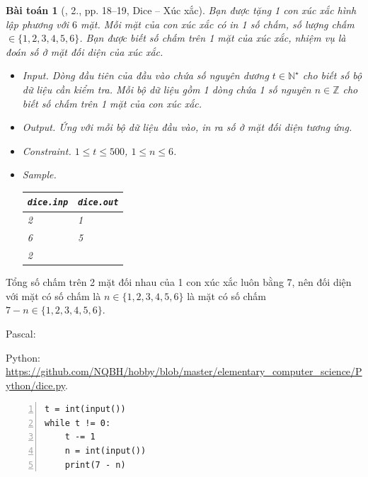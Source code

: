 \documentclass{article}
\newtheorem{baitoan}{Bài toán}
\begin{document}
\begin{baitoan}[\cite{Duc_200_BT_Python}, 2., pp. 18--19, Dice -- Xúc xắc]
	Bạn được tặng 1 con xúc xắc hình lập phương với $6$ mặt. Mỗi mặt của con xúc xắc có in 1 số chấm, số lượng chấm $\in\{1,2,3,4,5,6\}$. Bạn được biết số chấm trên 1 mặt của xúc xắc, nhiệm vụ là đoán số ở mặt đối diện của xúc xắc.
	\begin{itemize}
		\item {\sf Input.} Dòng đầu tiên của đầu vào chứa số nguyên dương $t\in\mathbb{N}^\star$ cho biết số bộ dữ liệu cần kiểm tra. Mỗi bộ dữ liệu gồm 1 dòng chứa 1 số nguyên $n\in\mathbb{Z}$ cho biết số chấm trên 1 mặt của con xúc xắc.
		\item {\sf Output.} Ứng với mỗi bộ dữ liệu đầu vào, in ra số ở mặt đối diện tương ứng.
		\item {\sf Constraint.} $1\le t\le500$, $1\le n\le6$.
		\item {\sf Sample.}
		\begin{table}[H]
			\centering
			\begin{tabular}{|l|l|}
				\hline
				\texttt{dice.inp} & \texttt{dice.out} \\
				\hline
				2 & 1 \\
				6 & 5 \\
				2 &  \\
				\hline
			\end{tabular}
		\end{table}
	\end{itemize}
\end{baitoan}
Tổng số chấm trên 2 mặt đối nhau của 1 con xúc xắc luôn bằng 7, nên đối diện với mặt có số chấm là $n\in\{1,2,3,4,5,6\}$ là mặt có số chấm $7 - n\in\{1,2,3,4,5,6\}$.

Pascal:

Python: \url{https://github.com/NQBH/hobby/blob/master/elementary_computer_science/Python/dice.py}.
\begin{Verbatim}[numbers=left,xleftmargin=5mm]
t = int(input())
while t != 0:
    t -= 1
    n = int(input())
    print(7 - n)
\end{Verbatim}
\end{document}
